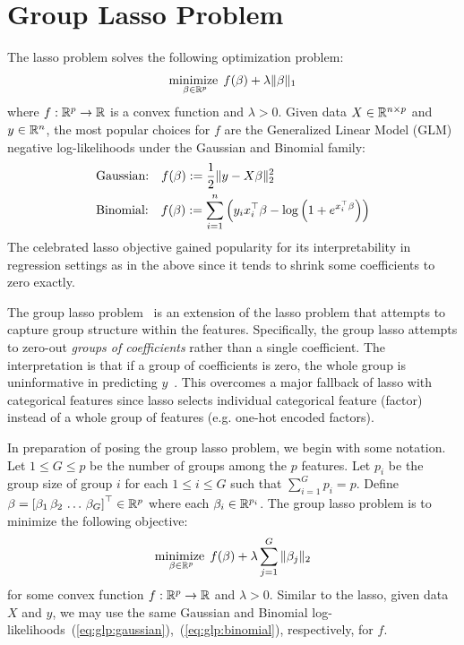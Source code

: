 \section{Group Lasso Problem}\label{sec:glp}

The lasso problem solves the following optimization problem:
\begin{align*}
    \operatorname*{minimize\;}_{\beta \in \mathbb{R}^p}
    f(\beta)
    + \lambda \|\beta\|_1
\end{align*}
where $f : \mathbb{R}^p \to \mathbb{R}$ is a convex function and $\lambda > 0$.
Given data $X \in \mathbb{R}^{n\times p}$ and $y\in \mathbb{R}^{n}$,
the most popular choices for $f$ are the Generalized Linear Model (GLM) 
negative log-likelihoods under the Gaussian and Binomial family:
\begin{align}
    &\text{Gaussian:} \quad f(\beta) := \frac{1}{2} \|y - X\beta\|_2^2 
    \label{eq:glp:gaussian}\\
    &\text{Binomial:} \quad f(\beta) := \sum\limits_{i=1}^n \left(y_i x_i^\top \beta - \log\left(1 + e^{x_i^\top \beta}\right)\right)
    \label{eq:glp:binomial}
\end{align}
The celebrated lasso objective gained popularity for its interpretability 
in regression settings as in the above since it tends to shrink some coefficients to zero exactly.

The group lasso problem~\citep{yuan:2006} is an extension of the lasso problem
that attempts to capture group structure within the features.
Specifically, the group lasso attempts to zero-out \emph{groups of coefficients} rather than a single coefficient.
The interpretation is that if a group of coefficients is zero, 
the whole group is uninformative in predicting $y$~\citep{meier:2008}.
This overcomes a major fallback of lasso with categorical features since
lasso selects individual categorical feature (factor)
instead of a whole group of features (e.g. one-hot encoded factors).

In preparation of posing the group lasso problem, we begin with some notation.
Let $1 \leq G \leq p$ be the number of groups among the $p$ features.
Let $p_i$ be the group size of group $i$ for each $1\leq i \leq G$
such that $\sum\limits_{i=1}^G p_i = p$.
Define $\beta = \left[\beta_1 \, \beta_2 \, \ldots \, \beta_G\right]^\top \in \mathbb{R}^p$
where each $\beta_i \in \mathbb{R}^{p_i}$.
The group lasso problem is to minimize the following objective:
\begin{align}
    \operatorname*{minimize\;}_{\beta \in \mathbb{R}^p}
    f(\beta)
    + \lambda \sum\limits_{j=1}^G \|\beta_j\|_2
    \label{eq:glp:objective}
\end{align}
for some convex function $f:\mathbb{R}^p \to \mathbb{R}$ and $\lambda > 0$.
Similar to the lasso, given data $X$ and $y$, we may use the same Gaussian and Binomial
log-likelihoods~(\ref{eq:glp:gaussian}),~(\ref{eq:glp:binomial}), respectively, for $f$.

